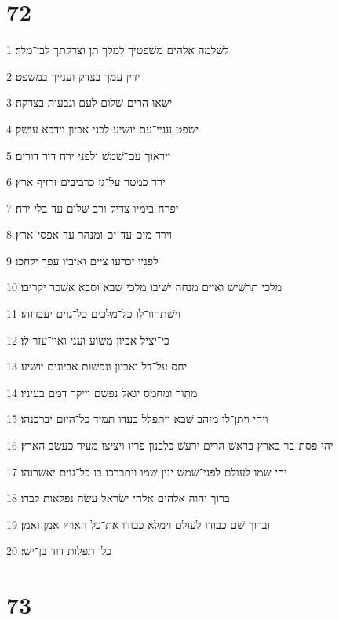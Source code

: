 \chapter{72}

\par 1 לשׁלמה אלהים משׁפטיך למלך תן וצדקתך לבן־מלך׃
\par 2 ידין עמך בצדק וענייך במשׁפט׃
\par 3 ישׂאו הרים שׁלום לעם וגבעות בצדקה׃
\par 4 ישׁפט עניי־עם יושׁיע לבני אביון וידכא עושׁק׃
\par 5 ייראוך עם־שׁמשׁ ולפני ירח דור דורים׃
\par 6 ירד כמטר על־גז כרביבים זרזיף ארץ׃
\par 7 יפרח־בימיו צדיק ורב שׁלום עד־בלי ירח׃
\par 8 וירד מים עד־ים ומנהר עד־אפסי־ארץ׃
\par 9 לפניו יכרעו ציים ואיביו עפר ילחכו׃
\par 10 מלכי תרשׁישׁ ואיים מנחה ישׁיבו מלכי שׁבא וסבא אשׁכר יקריבו׃
\par 11 וישׁתחוו־לו כל־מלכים כל־גוים יעבדוהו׃
\par 12 כי־יציל אביון משׁוע ועני ואין־עזר לו׃
\par 13 יחס על־דל ואביון ונפשׁות אביונים יושׁיע׃
\par 14 מתוך ומחמס יגאל נפשׁם וייקר דמם בעיניו׃
\par 15 ויחי ויתן־לו מזהב שׁבא ויתפלל בעדו תמיד כל־היום יברכנהו׃
\par 16 יהי פסת־בר בארץ בראשׁ הרים ירעשׁ כלבנון פריו ויציצו מעיר כעשׂב הארץ׃
\par 17 יהי שׁמו לעולם לפני־שׁמשׁ ינין שׁמו ויתברכו בו כל־גוים יאשׁרוהו׃
\par 18 ברוך יהוה אלהים אלהי ישׂראל עשׂה נפלאות לבדו׃
\par 19 וברוך שׁם כבודו לעולם וימלא כבודו את־כל הארץ אמן ואמן׃
\par 20 כלו תפלות דוד בן־ישׁי׃

\chapter{73}

